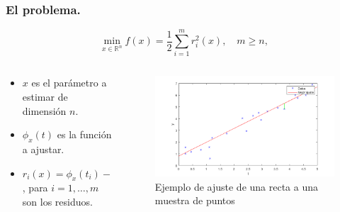 \documentclass{beamer}
\begin{document}
\begin{frame}
    \frametitle{El problema.}
    \begin{equation*}
        \min_{x\in \mathbb{R}^{n}}f(x) = \frac{1}{2}\sum_{i=1}^{m}r_i^2(x), \quad m\geq n,
    \end{equation*}
    \pause
\begin{columns}
    \begin{column}{0.4\textwidth}
        \begin{itemize}[label=\textbullet]
            \item $x$ es el parámetro a estimar de dimensión $n$. \pause
            \item $\phi_x(t)$ es la función a ajustar. \pause 
            \item $r_i(x) = \phi_x(t_i) - y_i$, para $i=1,\dots,m$ son los residuos. \pause
        \end{itemize}
    \end{column}
    \begin{column}{0.6\textwidth}  %
        \begin{figure}[h]
            \centering
            \includegraphics[width=1\textwidth]{imgs/examplelsqlin.png}
            \caption{Ejemplo de ajuste de una recta a una muestra de puntos}
        \end{figure}
    \end{column}
\end{columns}
\end{frame}
\end{document}
